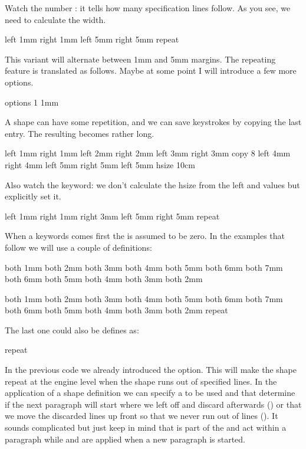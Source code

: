Watch the number : it tells how many specification lines follow. As you
see, we need to calculate the width.

\starttyping[option=TEX]
\startparagraphshape[test]
    left 1mm right 1mm
    left 5mm right 5mm
    repeat
\stopparagraphshape
\stoptyping

This variant will alternate between 1mm and 5mm margins. The repeating feature is
translated as follows. Maybe at some point I will introduce a few more options.

\starttyping[option=TEX]
 options 1
    1mm \dimexpr\hsize-1mm\relax
    5mm \dimexpr\hsize-5mm\relax
\stoptyping

A shape can have some repetition, and we can save keystrokes by copying the last
entry. The resulting \type {\parshape} becomes rather long.

\starttyping[option=TEX]
\startparagraphshape[test]
    left 1mm right 1mm
    left 2mm right 2mm
    left 3mm right 3mm
    copy 8
    left 4mm right 4mm
    left 5mm right 5mm
    left 5mm hsize 10cm
\stopparagraphshape
\stoptyping

Also watch the  keyword: we don't calculate the hsize from the \type
{left} and  values but explicitly set it.

\starttyping[option=TEX]
\startparagraphshape[test]
    left 1mm right 1mm
    right 3mm
    left 5mm right 5mm
    repeat
\stopparagraphshape
\stoptyping

When a  keywords comes first the  is assumed to be zero.
In the examples that follow we will use a couple of definitions:

\startbuffer[setup]
\startparagraphshape[test]
    both 1mm both 2mm both 3mm both 4mm both 5mm both 6mm
    both 7mm both 6mm both 5mm both 4mm both 3mm both 2mm
\stopparagraphshape
\stopbuffer

    both 1mm both 2mm both 3mm both 4mm both 5mm both 6mm
    both 7mm both 6mm both 5mm both 4mm both 3mm both 2mm
    repeat
\stopparagraphshape
\stopbuffer


The last one could also be defines as:

\starttyping[option=TEX]
     repeat
\stopparagraphshape
\stoptyping

In the previous code we already introduced the  option. This will
make the shape repeat at the engine level when the shape runs out of specified
lines. In the application of a shape definition we can specify a 
to be used and that determine if the next paragraph will start where we left off
and discard afterwards () or that we move the discarded lines up
front so that we never run out of lines (). It sounds complicated
but just keep in mind that  is part of the \type {\parshape} and
act within a paragraph while  and  are applied when a
new paragraph is started.

